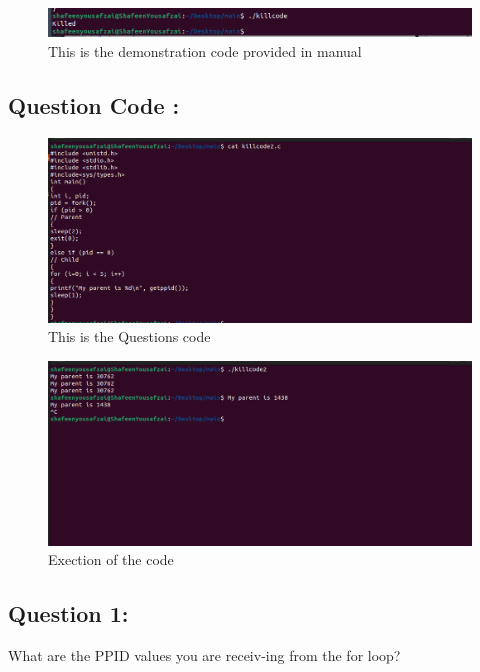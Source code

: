 \documentclass[12pt]{article}
\begin{document}
\begin{figure}[H]
    \centering
    \includegraphics[width=\textwidth]{21321.png}
    \caption{This is the demonstration code provided in manual }
    \label{fig:enter-label}
\end{figure}

\subsection{Question Code : }
\begin{figure}[H]
    \centering
    \includegraphics[width=\textwidth]{1212.png}
    \caption{This is the Questions code}
    \label{fig:enter-label}
\end{figure}

\begin{figure}[H]
    \centering
    \includegraphics[width=\textwidth]{sadsa.png}
    \caption{Exection of the code}
    \label{fig:enter-label}
\end{figure}

\subsection{Question 1:}
What are the PPID values you are receiv-ing from the for loop?
\end{document}
